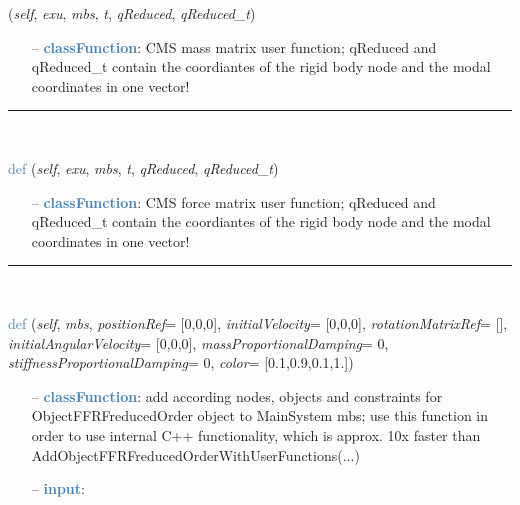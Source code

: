 \begin{itemize}[leftmargin=1.4cm]
\begin{itemize}[leftmargin=0.5cm]
\begin{itemize}[leftmargin=1.4cm]
\begin{itemize}[leftmargin=1.4cm]
\begin{itemize}[leftmargin=0.5cm]
\begin{flushleft}
({\it self}, {\it exu}, {\it mbs}, {\it t}, {\it qReduced}, {\it qReduced\_t})
\end{flushleft}
\setlength{\itemindent}{0.7cm}
\begin{itemize}[leftmargin=0.7cm]
  \item[--]  \textcolor{steelblue}{\bf classFunction}: CMS mass matrix user function; qReduced and qReduced\_t contain the coordiantes of the rigid body node and the modal coordinates in one vector!\vspace{12pt}\end{itemize}
%
\noindent\rule{8cm}{0.75pt}\vspace{1pt} \\ 
\begin{flushleft}
\noindent \textcolor{steelblue}{def {\bf {}}}\label{sec:FEM:ObjectFFRFreducedOrderInterface:UFforceFFRFreducedOrder}
({\it self}, {\it exu}, {\it mbs}, {\it t}, {\it qReduced}, {\it qReduced\_t})
\end{flushleft}
\setlength{\itemindent}{0.7cm}
\begin{itemize}[leftmargin=0.7cm]
  \item[--]  \textcolor{steelblue}{\bf classFunction}: CMS force matrix user function; qReduced and qReduced\_t contain the coordiantes of the rigid body node and the modal coordinates in one vector!\vspace{12pt}\end{itemize}
%
\noindent\rule{8cm}{0.75pt}\vspace{1pt} \\ 
\begin{flushleft}
\noindent \textcolor{steelblue}{def {\bf {}}}\label{sec:FEM:ObjectFFRFreducedOrderInterface:AddObjectFFRFreducedOrder}
({\it self}, {\it mbs}, {\it positionRef}= [0,0,0], {\it initialVelocity}= [0,0,0], {\it rotationMatrixRef}= [], {\it initialAngularVelocity}= [0,0,0], {\it massProportionalDamping}= 0, {\it stiffnessProportionalDamping}= 0, {\it color}= [0.1,0.9,0.1,1.])
\end{flushleft}
\setlength{\itemindent}{0.7cm}
\begin{itemize}[leftmargin=0.7cm]
  \item[--]  \textcolor{steelblue}{\bf classFunction}: add according nodes, objects and constraints for ObjectFFRFreducedOrder object to MainSystem mbs; use this function in order to use internal C++ functionality, which is approx. 10x faster than AddObjectFFRFreducedOrderWithUserFunctions(...)  \item[--]  \textcolor{steelblue}{\bf input}: \vspace{-6pt}

\end{itemize}
\end{itemize}
\end{itemize}
\end{itemize}
\end{itemize}
\end{itemize}
